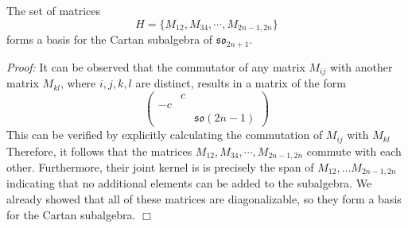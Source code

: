 \documentclass[11pt, headheight=30pt]{scrartcl}
\begin{document}
\begin{claim*}
The set of matrices 
\[ H=\{ M_{12}, M_{34}, \cdots , M_{2n-1,2n} \} \]
forms a basis for the Cartan subalgebra of $\mathfrak{so}_{2n+1}$.
\end{claim*}
\textit{Proof: } It can be observed that the commutator of any matrix $M_{ij}$ with another matrix $M_{kl}$, where $i,j,k,l$ are distinct, results in a matrix of the form 
\[ 
\begin{pmatrix}
&c& \\
-c & & \\
& & \mathfrak{so}(2n-1)
\end{pmatrix}    
\]
This can be verified by explicitly calculating the commutation of $M_{ij}$ with $M_{kl}$
Therefore, it follows that the matrices $M_{12}, M_{34}, \cdots , M_{2n-1,2n}$
commute with each other. Furthermore, their joint kernel is is precisely
the span of $M_{12},\dots M_{2n-1,2n}$ indicating
that no additional elements can be added to the subalgebra. We already showed
that all of these
matrices are diagonalizable, so they form a basis for the Cartan subalgebra. $\Box$
\end{document}
